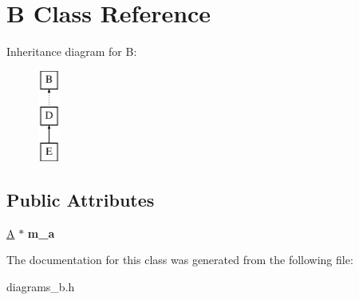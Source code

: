 \hypertarget{classB}{\section{B Class Reference}
\label{classB}
}
Inheritance diagram for B\-:\begin{figure}[H]
\begin{center}
\leavevmode
\includegraphics[height=3.000000cm]{classB}
\end{center}
\end{figure}
\subsection*{Public Attributes}
\begin{DoxyCompactItemize}
\item 
\hypertarget{classB_a26c70b64fe7cf17fcced7755ecff7537}{\hyperlink{classA}{A} $\ast$ {\bfseries m\-\_\-a}}\label{classB_a26c70b64fe7cf17fcced7755ecff7537}

\end{DoxyCompactItemize}


The documentation for this class was generated from the following file\-:\begin{DoxyCompactItemize}
\item 
diagrams\-\_\-b.\-h\end{DoxyCompactItemize}
